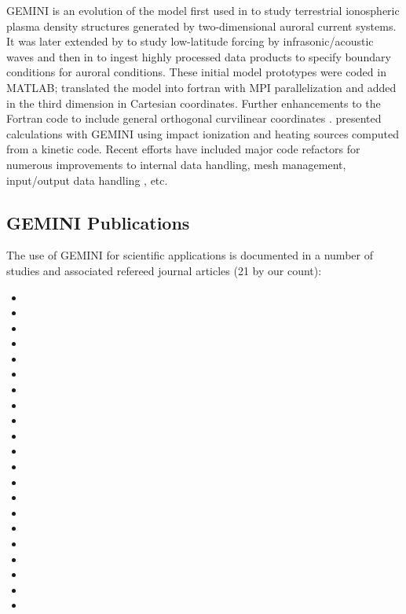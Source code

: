 \documentclass[11pt,letterpaper]{article}
\begin{document}
GEMINI is an evolution of the model first used in \citet{Zettergren:2012} to study terrestrial ionospheric plasma density structures generated by two-dimensional auroral current systems.  It was later extended by \citet{Zettergren:2013} to study low-latitude forcing by infrasonic/acoustic waves and then in \citet{Zettergren:2014} to ingest highly processed data products to specify boundary conditions for auroral conditions.  These initial model prototypes were coded in MATLAB; \citet{Zettergren:2015b} translated the model into fortran with MPI parallelization and added in the third dimension in Cartesian coordinates.  Further enhancements to the Fortran code to include general orthogonal curvilinear coordinates \citep{Zettergren:2019}.  \citet{Diaz:2021} presented calculations with GEMINI using impact ionization and heating sources computed from a kinetic code.  Recent efforts have included major code refactors for numerous improvements to internal data handling, mesh management, input/output data handling \citep{Clayton:2021}, etc. 

\subsection{GEMINI Publications}

The use of GEMINI for scientific applications is documented in a number of studies and associated refereed journal articles (21 by our count):  
\begin{itemize}
  \item {}
  \item {}
  \item {}
  \item {}
  \item {}
  \item {}
  \item {}
  \item {}
  \item {}
  \item {}
  \item {}
  \item {}  
  \item {}  
  \item {}  
  \item {} 
  \item {}   
  \item {} 
  \item {} 
  \item {} 
  \item {} 
  \item {}  
\end{itemize}
\end{document}
